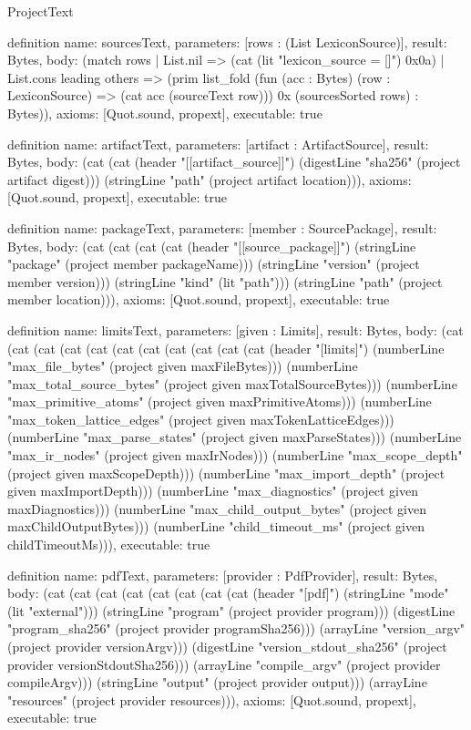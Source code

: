 \begin{lexlean}{ProjectText}
\begin{semanticmodule}
definition{
  name: sourcesText,
  parameters: [rows : (List LexiconSource)],
  result: Bytes,
  body: (match rows
    | List.nil => (cat (lit "lexicon_source = []") 0x0a)
    | List.cons leading others => (prim list_fold (fun (acc : Bytes) (row : LexiconSource) => (cat acc (sourceText row))) 0x (sourcesSorted rows) : Bytes)),
  axioms: [Quot.sound, propext],
  executable: true
}

definition{
  name: artifactText,
  parameters: [artifact : ArtifactSource],
  result: Bytes,
  body: (cat (cat (header "[[artifact_source]]") (digestLine "sha256" (project artifact digest))) (stringLine "path" (project artifact location))),
  axioms: [Quot.sound, propext],
  executable: true
}

definition{
  name: packageText,
  parameters: [member : SourcePackage],
  result: Bytes,
  body: (cat (cat (cat (cat (header "[[source_package]]") (stringLine "package" (project member packageName))) (stringLine "version" (project member version))) (stringLine "kind" (lit "path"))) (stringLine "path" (project member location))),
  axioms: [Quot.sound, propext],
  executable: true
}

definition{
  name: limitsText,
  parameters: [given : Limits],
  result: Bytes,
  body: (cat (cat (cat (cat (cat (cat (cat (cat (cat (cat (cat (header "[limits]") (numberLine "max_file_bytes" (project given maxFileBytes))) (numberLine "max_total_source_bytes" (project given maxTotalSourceBytes))) (numberLine "max_primitive_atoms" (project given maxPrimitiveAtoms))) (numberLine "max_token_lattice_edges" (project given maxTokenLatticeEdges))) (numberLine "max_parse_states" (project given maxParseStates))) (numberLine "max_ir_nodes" (project given maxIrNodes))) (numberLine "max_scope_depth" (project given maxScopeDepth))) (numberLine "max_import_depth" (project given maxImportDepth))) (numberLine "max_diagnostics" (project given maxDiagnostics))) (numberLine "max_child_output_bytes" (project given maxChildOutputBytes))) (numberLine "child_timeout_ms" (project given childTimeoutMs))),
  executable: true
}

definition{
  name: pdfText,
  parameters: [provider : PdfProvider],
  result: Bytes,
  body: (cat (cat (cat (cat (cat (cat (cat (cat (header "[pdf]") (stringLine "mode" (lit "external"))) (stringLine "program" (project provider program))) (digestLine "program_sha256" (project provider programSha256))) (arrayLine "version_argv" (project provider versionArgv))) (digestLine "version_stdout_sha256" (project provider versionStdoutSha256))) (arrayLine "compile_argv" (project provider compileArgv))) (stringLine "output" (project provider output))) (arrayLine "resources" (project provider resources))),
  axioms: [Quot.sound, propext],
  executable: true
}


\end{semanticmodule}
\end{lexlean}
